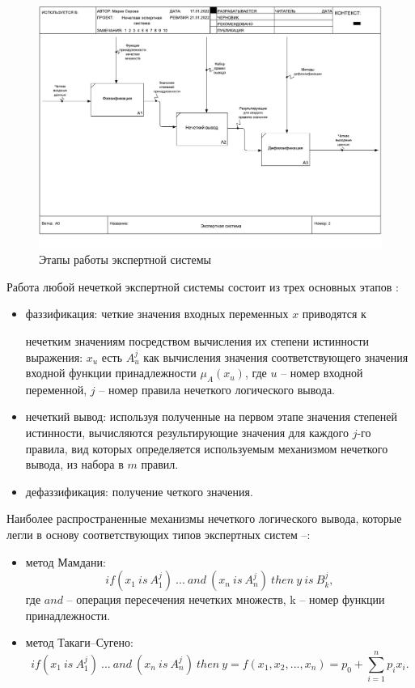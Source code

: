 \begin{figure}[H]
	\centering
	\includegraphics[width=0.75\linewidth]{img/expsys1}
	\caption{Этапы работы экспертной системы}
	\label{fig:expsys1}
\end{figure}

Работа любой нечеткой экспертной системы состоит из трех основных этапов \cite{SettingMamdani}:
\begin{itemize}
	\item фаззификация: четкие значения входных переменных $x$ приводятся к 
	
	нечетким значениям посредством вычисления их степени истинности выражения: $x_u$ есть $A_u^j$ как вычисления значения соответствующего значения входной функции принадлежности $\mu_A(x_u)$, где $u$ – номер входной переменной, $j$ – номер правила нечеткого логического вывода.
	\item нечеткий вывод: используя полученные на первом этапе значения степеней истинности, вычисляются результирующие значения для каждого $j$-го правила, вид которых определяется используемым механизмом нечеткого вывода, из набора в $m$ правил.
	\item дефаззификация: получение четкого значения.
\end{itemize}

Наиболее распространенные механизмы нечеткого логического вывода, которые легли в основу соответствующих типов экспертных систем \cite{SettingMamdani}--\cite{MultifuncImit}:
\begin{itemize}
	\item метод Мамдани: 
	\begin{equation}
	\label{eq:Mamdani}
	if(x_1~is~A_1^j)~...~and~(x_n~is~A_n^j)~then~y~is~B_k^j,
	\end{equation}
	где $and$ – операция пересечения нечетких множеств, k – номер функции принадлежности.
	\item метод Такаги--Сугено: 
	\begin{equation}
	if(x_1~is~A_1^j)~...~and~(x_n~is~A_n^j)~then~y=f(x_1,x_2, ..., x_n)=p_0+\sum_{i=1}^{n}p_ix_i.
	\end{equation}
\end{itemize}

